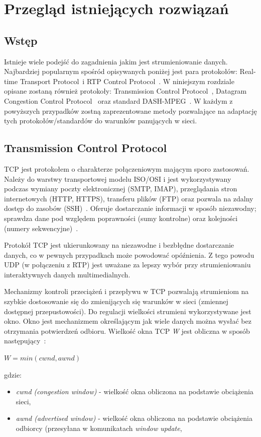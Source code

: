 \chapter{Przegląd istniejących rozwiązań}
\label{cha:rozdzial3}

\section{Wstęp}

Istnieje wiele podejść do zagadnienia jakim jest strumieniowanie danych. Najbardziej popularnym spośród opisywanych poniżej jest para protokołów: Real-time Transport Protocol~i RTP Control Protocol~\cite{RFC3550}. W niniejszym rozdziale opisane zostaną również protokoły: Transmission Control Protocol~\cite{RFC793}, Datagram Congestion Control Protocol~\cite{RFC4340} oraz standard DASH-MPEG~\cite{ISO-IEC-DASH}. W każdym z powyższych przypadków zostną zaprezentowane metody pozwalające na adaptację tych protokołów/standardów do warunków panujących w sieci.

\section{Transmission Control Protocol}

TCP jest protokołem o charakterze połączeniowym mającym sporo zastosowań. Należy do warstwy transportowej modelu ISO/OSI i jest wykorzystywany podczas wymiany poczty elektronicznej (SMTP, IMAP), przeglądania stron internetowych (HTTP, HTTPS), transferu plików (FTP) oraz pozwala na zdalny dostęp do zasobów (SSH)~\cite{Stevens}. Oferuje dostarczanie informacji w sposób niezawodny; sprawdza dane pod względem poprawności (sumy kontrolne) oraz kolejności (numery sekwencyjne)~\cite{RFC793}.

Protokół TCP jest ukierunkowany na niezawodne i bezbłędne dostarczanie danych, co w pewnych przypadkach może powodować opóźnienia. Z tego powodu UDP (w połączeniu z RTP) jest uważane za lepszy wybór przy strumieniowaniu interaktywnych danych multimedialnych. 

Mechanizmy kontroli przeciążeń i przepływu w TCP pozwalają strumieniom na szybkie dostosowanie się do zmienijących się warunków w sieci (zmiennej dostępnej przepustowości). Do regulacji wielkości strumieni wykorzystywane jest okno. Okno jest mechanizmem określającym jak wiele danych można wysłać bez otrzymania potwierdzeń odbioru. Wielkość okna TCP \textit{W} jest obliczna w sposób następujący~\cite{Stevens}:
\begin{center}
$W = min(cwnd, awnd)$
\end{center}
gdzie: 
\begin{itemize}
\item \textit{cwnd (congestion window)} - wielkość okna obliczona na podstawie obciążenia sieci,
\item \textit{awnd (advertised window)} - wielkość okna obliczona na podstawie obciążenia odbiorcy (przesyłana w komunikatach \textit{window update},
\end{itemize}

